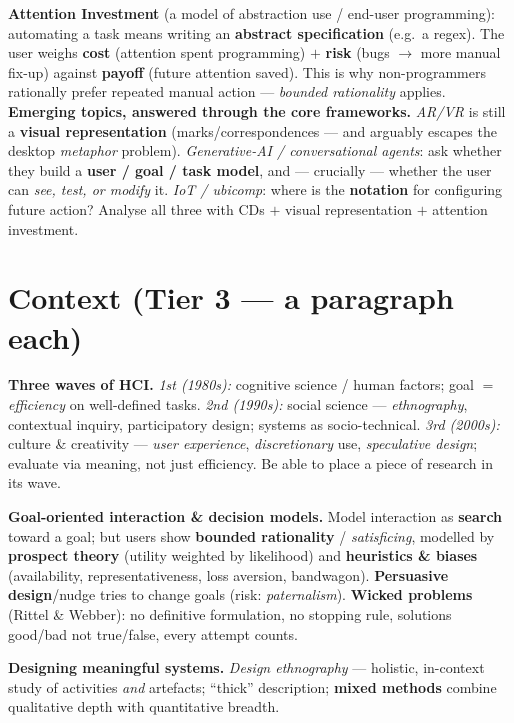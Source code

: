 \documentclass[11pt,a4paper]{article}
\begin{document}
\begin{useful}
\textbf{Attention Investment} (a model of abstraction use / end-user programming): automating a task means writing an \textbf{abstract specification} (e.g.\ a regex). The user weighs \textbf{cost} (attention spent programming) $+$ \textbf{risk} (bugs $\to$ more manual fix-up) against \textbf{payoff} (future attention saved). This is why non-programmers rationally prefer repeated manual action --- \emph{bounded rationality} applies.\\[3pt]
\textbf{Emerging topics, answered through the core frameworks.} \emph{AR/VR} is still a \textbf{visual representation} (marks/correspondences --- and arguably escapes the desktop \emph{metaphor} problem). \emph{Generative-AI / conversational agents}: ask whether they build a \textbf{user / goal / task model}, and --- crucially --- whether the user can \emph{see, test, or modify} it. \emph{IoT / ubicomp}: where is the \textbf{notation} for configuring future action? Analyse all three with CDs $+$ visual representation $+$ attention investment.
\end{useful}

\section{Context (Tier 3 --- a paragraph each)}

\textbf{Three waves of HCI.} \emph{1st (1980s):} cognitive science / human factors; goal $=$ \emph{efficiency} on well-defined tasks. \emph{2nd (1990s):} social science --- \emph{ethnography}, contextual inquiry, participatory design; systems as socio-technical. \emph{3rd (2000s):} culture \& creativity --- \emph{user experience}, \emph{discretionary} use, \emph{speculative design}; evaluate via meaning, not just efficiency. Be able to place a piece of research in its wave.

\textbf{Goal-oriented interaction \& decision models.} Model interaction as \textbf{search} toward a goal; but users show \textbf{bounded rationality} / \emph{satisficing}, modelled by \textbf{prospect theory} (utility weighted by likelihood) and \textbf{heuristics \& biases} (availability, representativeness, loss aversion, bandwagon). \textbf{Persuasive design}/nudge tries to change goals (risk: \emph{paternalism}). \textbf{Wicked problems} (Rittel \& Webber): no definitive formulation, no stopping rule, solutions good/bad not true/false, every attempt counts.

\textbf{Designing meaningful systems.} \emph{Design ethnography} --- holistic, in-context study of activities \emph{and} artefacts; ``thick'' description; \textbf{mixed methods} combine qualitative depth with quantitative breadth.
\end{document}
